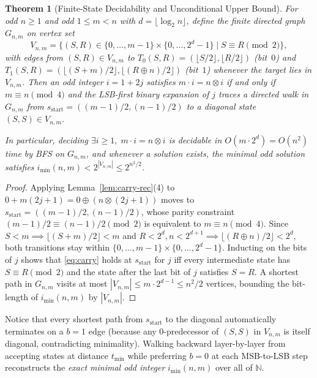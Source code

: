 \documentclass[11pt]{article}
\newtheorem{theorem}{Theorem}[section]
\theoremstyle{definition}
\newcommand{\N}{\mathbb{N}}
\newcommand{\clmul}{\otimes}
\begin{document}
\begin{theorem}[Finite-State Decidability and Unconditional Upper Bound]
\label{thm:automaton}
For odd $n \ge 1$ and odd $1 \le m < n$ with $d = \lfloor \log_2 n \rfloor$, define the finite directed graph $G_{n,m}$ on vertex set
\[
V_{n,m} = \{ (S, R) \in \{0, \dots, m-1\} \times \{0, \dots, 2^d - 1\} \mid S \equiv R \pmod 2 \},
\]
with edges from $(S, R) \in V_{n,m}$ to $T_0(S, R) = (\lfloor S/2 \rfloor, \lfloor R/2 \rfloor)$ (bit~$0$) and $T_1(S, R) = (\lfloor (S+m)/2 \rfloor, \lfloor (R \oplus n)/2 \rfloor)$ (bit~$1$) whenever the target lies in $V_{n,m}$. Then an odd integer $i = 1 + 2j$ satisfies $m \cdot i = n \clmul i$ if and only if $m \equiv n \pmod 4$ and the LSB-first binary expansion of $j$ traces a directed walk in $G_{n,m}$ from $s_{\mathrm{start}} = ((m-1)/2, (n-1)/2)$ to a diagonal state $(S, S) \in V_{n,m}$.

In particular, deciding $\exists i \ge 1,\; m \cdot i = n \clmul i$ is decidable in $O(m \cdot 2^d) = O(n^2)$ time by BFS on $G_{n,m}$, and whenever a solution exists, the minimal odd solution satisfies $i_{\min}(n, m) < 2^{|V_{n,m}|} \le 2^{n^2/2}$.
\end{theorem}

\begin{proof}
Applying Lemma~\ref{lem:carry-rec}(4) to $0 + m(2j+1) = 0 \oplus (n \clmul (2j+1))$ moves to $s_{\mathrm{start}} = ((m-1)/2, (n-1)/2)$, whose parity constraint $(m-1)/2 \equiv (n-1)/2 \pmod 2$ is equivalent to $m \equiv n \pmod 4$. Since $S < m \implies \lfloor (S+m)/2 \rfloor < m$ and $R < 2^d, n < 2^{d+1} \implies \lfloor (R \oplus n)/2 \rfloor < 2^d$, both transitions stay within $\{0, \dots, m-1\} \times \{0, \dots, 2^d - 1\}$. Inducting on the bits of $j$ shows that \eqref{eq:carry} holds at $s_{\mathrm{start}}$ for $j$ iff every intermediate state has $S \equiv R \pmod 2$ and the state after the last bit of $j$ satisfies $S = R$. A shortest path in $G_{n,m}$ visits at most $|V_{n,m}| \le m \cdot 2^{d-1} \le n^2 / 2$ vertices, bounding the bit-length of $i_{\min}(n, m)$ by $|V_{n,m}|$.
\end{proof}

Notice that every shortest path from $s_{\mathrm{start}}$ to the diagonal automatically terminates on a $b = 1$ edge (because any $0$-predecessor of $(S, S)$ in $V_{n,m}$ is itself diagonal, contradicting minimality). Walking backward layer-by-layer from accepting states at distance $t_{\min}$ while preferring $b = 0$ at each MSB-to-LSB step reconstructs the \emph{exact minimal odd integer} $i_{\min}(n, m)$ over all of $\N$.
\end{document}
